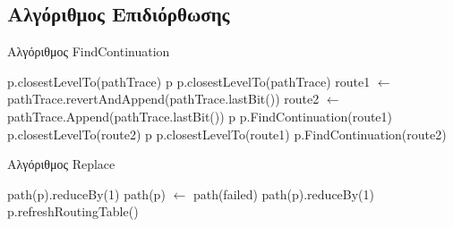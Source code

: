 \subsection{Αλγόριθμος Επιδιόρθωσης}

\begin{algorithm}
\caption{Αλγόριθμος FindContinuation}
\label{algo:continuation}
\begin{algorithmic}[1]
            \State \Return p.closestLevelTo(pathTrace)
        \EndIf
            \State \Return p
        \EndIf
            \State \Return p.closestLevelTo(pathTrace)
        \EndIf
        \State route1 $\gets$ pathTrace.revertAndAppend(pathTrace.lastBit())
        \State route2 $\gets$ pathTrace.Append(pathTrace.lastBit())
                    \State \Return p
                \Else
                    \State \Return p.FindContinuation(route1)
                \EndIf
            \Else
                \State \Return p.closestLevelTo(route2)
            \EndIf
        \Else
                    \State \Return p
                \Else
                    \State \Return p.closestLevelTo(route1)
                \EndIf
            \Else
                \State \Return p.FindContinuation(route2)
            \EndIf
        \EndIf

  \EndProcedure
\end{algorithmic}
\end{algorithm}

\begin{algorithm}
\caption{Αλγόριθμος Replace}
\label{algo:replace}
\begin{algorithmic}[1]
            \State path(p).reduceBy(1)
        \Else
	            \State path(p) $\gets$ path(failed)
            \Else
                \State path(p).reduceBy(1)
            \EndIf
        \EndIf
        \State p.refreshRoutingTable()
  \EndProcedure
\end{algorithmic}
\end{algorithm}
